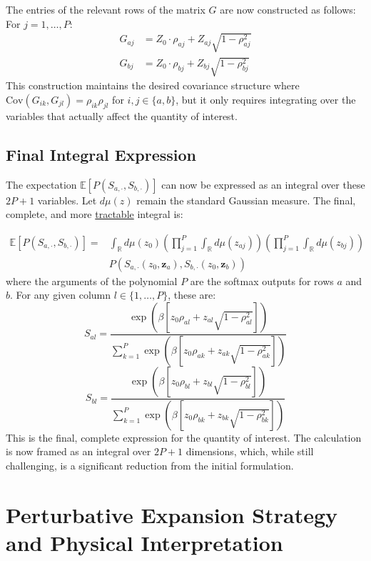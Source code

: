 \documentclass[12pt]{article}
\begin{document}
The entries of the relevant rows of the matrix $G$ are now constructed as follows:
For $j = 1, \dots, P$:
\begin{align*}
G_{aj} &= Z_0 \cdot \rho_{aj} + Z_{aj} \sqrt{1 - \rho_{aj}^2} \\
G_{bj} &= Z_0 \cdot \rho_{bj} + Z_{bj} \sqrt{1 - \rho_{bj}^2}
\end{align*}
This construction maintains the desired covariance structure where $\text{Cov}(G_{ik}, G_{jl}) = \rho_{ik}\rho_{jl}$ for $i,j \in \{a,b\}$, but it only requires integrating over the variables that actually affect the quantity of interest.

\subsection{Final Integral Expression}
The expectation $\mathbb{E}[P(S_{a, \cdot}, S_{b, \cdot})]$ can now be expressed as an integral over these $2P+1$ variables. Let $d\mu(z)$ remain the standard Gaussian measure. The final, complete, and more \underline{tractable} integral is:

\begin{align*}
\mathbb{E}[P(S_{a, \cdot}, S_{b, \cdot})] = & \int_{\mathbb{R}} d\mu(z_0) \left( \prod_{j=1}^{P} \int_{\mathbb{R}} d\mu(z_{aj}) \right) \left( \prod_{j=1}^{P} \int_{\mathbb{R}} d\mu(z_{bj}) \right) \\
& P\left( S_{a, \cdot}(z_0, \mathbf{z}_a), S_{b, \cdot}(z_0, \mathbf{z}_b) \right)
\end{align*}
where the arguments of the polynomial $P$ are the softmax outputs for rows $a$ and $b$. For any given column $l \in \{1, \dots, P\}$, these are:
\[
S_{al} = \frac{\exp\left(\beta \left[z_0 \rho_{al} + z_{al} \sqrt{1-\rho_{al}^2}\right]\right)}{\sum_{k=1}^{P} \exp\left(\beta \left[z_0 \rho_{ak} + z_{ak} \sqrt{1-\rho_{ak}^2}\right]\right)}
\]
\[
S_{bl} = \frac{\exp\left(\beta \left[z_0 \rho_{bl} + z_{bl} \sqrt{1-\rho_{bl}^2}\right]\right)}{\sum_{k=1}^{P} \exp\left(\beta \left[z_0 \rho_{bk} + z_{bk} \sqrt{1-\rho_{bk}^2}\right]\right)}
\]
This is the final, complete expression for the quantity of interest. The calculation is now framed as an integral over $2P+1$ dimensions, which, while still challenging, is a significant reduction from the initial formulation.

\section{Perturbative Expansion Strategy and Physical Interpretation}
\end{document}
